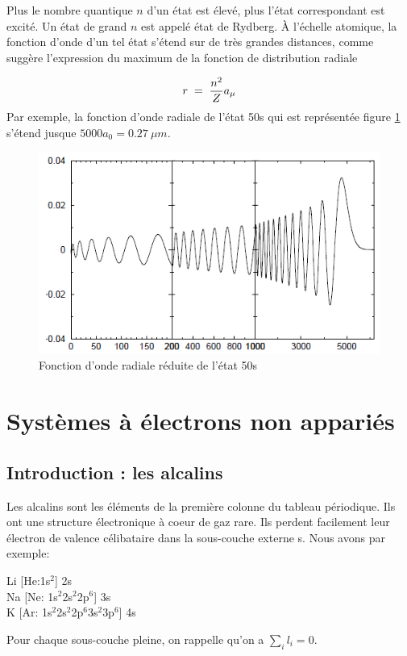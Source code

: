 Plus le nombre quantique $n$ d'un état est élevé, plus l'état correspondant est excité. Un état de grand $n$ est appelé état de Rydberg. À l'échelle atomique, la fonction d'onde d'un tel état s'étend sur de très grandes distances, comme suggère l'expression du maximum de la fonction de distribution radiale

\[
    r\; = \; \dfrac{n^2}{Z}a_{\mu}
\]
Par exemple, la fonction d'onde radiale de l'état 50s qui est représentée figure \ref{fig:50s} s'étend jusque $5000a_0= \SI{0.27}{\mu m}$.

\begin{figure}[htp]
    \centering
    \includegraphics{Images2/50s.PNG}
    \caption{Fonction d'onde radiale réduite de l'état 50s}
    \label{fig:50s}
\end{figure}



\newpage
\section{Systèmes à électrons non appariés}
\subsection{Introduction : les alcalins}
Les alcalins sont les éléments de la première colonne du tableau périodique. Ils ont une structure électronique à coeur de gaz rare. Ils perdent facilement leur électron de valence célibataire dans la sous-couche externe s. Nous avons par exemple:

\begin{center}
    Li [He:1s$^{2}$] 2s \\
    Na [Ne: 1s$^{2}$2s$^{2}$2p$^{6}$] 3s \\
    K [Ar: 1s$^{2}$2s$^{2}$2p$^{6}$3s$^{2}$3p$^{6}$] 4s
\end{center}
Pour chaque sous-couche pleine, on rappelle qu'on a $\sum_i l_i = 0$.

